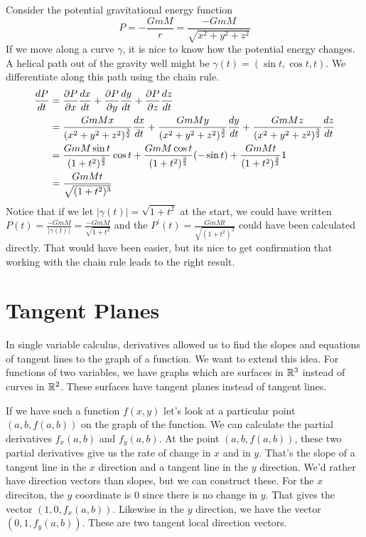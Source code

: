\documentclass[fleqn,letterpaper]{report}
\begin{document}
\begin{example}
Consider the potential gravitational energy function 
\begin{equation*}
P = - \frac{GmM}{r} = \frac{-GmM}{\sqrt{x^2 + y^2 + z^2}}
\end{equation*}
If we move along a curve $\gamma$, it is nice to know how the
potential energy changes. A helical path out of the gravity
well might be $\gamma(t) = (\sin t, \cos t, t)$. We
differentiate along this path using the chain rule. 
\begin{align*}
\frac{dP}{dt} & = 
\frac{\partial P}{\partial x} \frac{dx}{dt} + 
\frac{\partial P}{\partial y} \frac{dy}{dt} + 
\frac{\partial P}{\partial z} \frac{dz}{dt} \\
& = 
\frac{GmMx}{(x^2 + y^2 + z^2)^{\frac{3}{2}}} \frac{dx}{dt} + 
\frac{GmMy}{(x^2 + y^2 + z^2)^{\frac{3}{2}}} \frac{dy}{dt} + 
\frac{GmMz}{(x^2 + y^2 + z^2)^{\frac{3}{2}}} \frac{dz}{dt} \\
& = 
\frac{GmM\sin t}{(1 + t^2)^{\frac{3}{2}}} \cos t + 
\frac{GmM\cos t}{(1 + t^2)^{\frac{3}{2}}} (-\sin t) + 
\frac{GmMt}{(1 + t^2)^{\frac{3}{2}}} 1 \\
& = \frac{GmMt}{\sqrt{(1+t^2)^3}} 
\end{align*}
Notice that if we let $|\gamma(t)| = \sqrt{1 + t^2}$ at the
start, we could have written $P(t) = \frac{-GmM}{|\gamma(t)|} =
\frac{-GmM}{\sqrt{1+t^2}}$ and the $P^\prime(t) =
\frac{GmMt}{\sqrt{(1+t^2)^3}}$ could have been calculated
directly. That would have been easier, but its nice to get
confirmation that working with the chain rule leads to the
right result. 
\end{example}

\section{Tangent Planes}
\label{tangent-planes}

In single variable calculus, derivatives allowed us to find
the slopes and equations of tangent lines to the graph of a
function. We want to extend this idea. For functions of two
variables, we have graphs which are surfaces in $\mathbb{R}^3$
instead of curves in $\mathbb{R}^2$. These surfaces have tangent
planes instead of tangent lines.

If we have such a function $f(x,y)$ let's look at a particular
point $(a,b,f(a,b))$ on the graph of the function. We can
calculate the partial derivatives $f_x(a,b)$ and $f_y(a,b)$.
At the point $(a,b,f(a,b))$, these two partial derivatives
give us the rate of change in $x$ and in $y$. That's the
slope of a tangent line in the $x$ direction and a tangent
line in the $y$ direction. We'd rather have direction vectors
than slopes, but we can construct these. For the $x$
direciton, the $y$ coordinate is $0$ since there is no change
in $y$. That gives the vector $(1, 0, f_x(a,b))$. Likewise
in the $y$ direction, we have the vector $(0,1,f_y(a,b))$.
These are two tangent local direction vectors.
\end{document}
